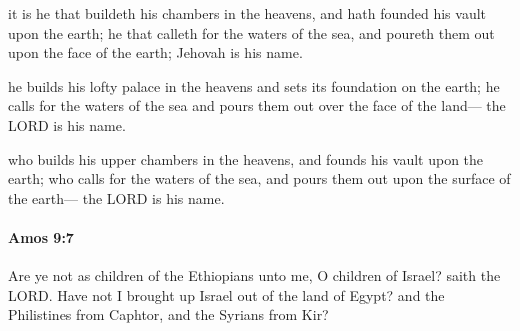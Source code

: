 			\begin{versebox}
					\item[BHS] 
					\item[LXX] 
					\item[ASV] it is he that buildeth his chambers in the heavens, and hath founded his vault upon the earth; he that calleth for the waters of the sea, and poureth them out upon the face of the earth; Jehovah is his name.
					\item[NIV] he builds his lofty palace in the heavens and sets its foundation on the earth; he calls for the waters of the sea and pours them out over the face of the land— the LORD is his name.
					\item[NRSV] who builds his upper chambers in the heavens, and founds his vault upon the earth; who calls for the waters of the sea, and pours them out upon the surface of the earth— the LORD is his name.
			\end{versebox}

		\paragraph{Amos 9:7} %
			\label{AMOS-9-7}

			Are ye not as children of the Ethiopians unto me, O children of Israel? saith the LORD. Have not I brought up Israel out of the land of Egypt? and the Philistines from Caphtor, and the Syrians from Kir?

